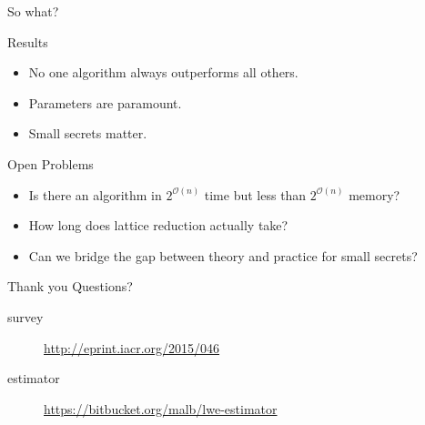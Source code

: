 \documentclass[10pt,compress]{beamer}
\newcommand{\bigO}[1]{\ensuremath{\mathcal{O}\left(#1\right)}\xspace}
\begin{document}
\begin{frame}{So what?}

  \begin{alertblock}{Results}
    \begin{itemize}
    \item No one algorithm always outperforms all others.
    \item Parameters are paramount.
    \item Small secrets matter.
    \end{itemize}
  \end{alertblock}

  \begin{alertblock}{Open Problems}
    \begin{itemize}
    \item Is there an algorithm in $2^{\bigO{n}}$ time but less than $2^{\bigO{n}}$ memory?
    \item How long does lattice reduction actually take?
    \item Can we bridge the gap between theory and practice for small secrets?
    \end{itemize}
  \end{alertblock}
\end{frame}


\begin{frame}{Thank you}
  \centering
  \alert{\Large Questions?} \\
  \vfill
  \begin{description}
  \item[survey] \url{http://eprint.iacr.org/2015/046}
  \item[estimator] \url{https://bitbucket.org/malb/lwe-estimator}
  \end{description}
\end{frame}

\newcommand{\etalchar}[1]{$^{#1}$}
\end{document}
